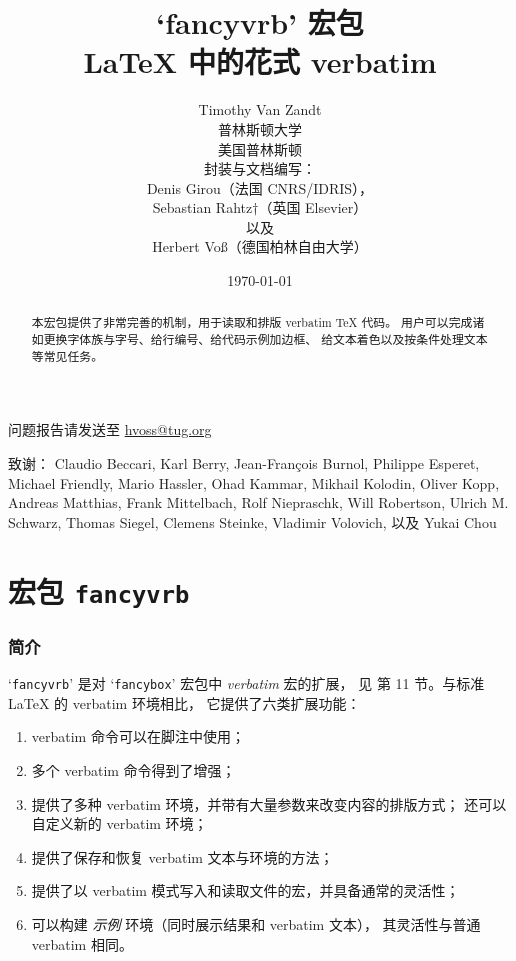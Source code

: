 \documentclass[twoside]{article}
\title{`\textsf{fancyvrb}' 宏包\\\LaTeX{} 中的花式 verbatim}
\author{Timothy Van Zandt\\普林斯顿大学\\美国普林斯顿\\[5mm]
        {封装与文档编写：}\\
        {\footnotesize Denis Girou（法国 CNRS/IDRIS），}\\[-.2mm]
        {\footnotesize Sebastian Rahtz$\dagger$（英国 Elsevier）}\\[-.2mm]
        {\footnotesize 以及}\\[-.2mm]
        {\footnotesize Herbert Voß（德国柏林自由大学）}
        }
\date{\today}
\newcommand\FBoxPackage{`\texttt{fancybox}'}
\newcommand\FVrbPackage{`\texttt{fancyvrb}'}
\begin{document}
\maketitle
%
\begin{abstract}
本宏包提供了非常完善的机制，用于读取和排版 verbatim \TeX{} 代码。
用户可以完成诸如更换字体族与字号、给行编号、给代码示例加边框、
给文本着色以及按条件处理文本等常见任务。
\end{abstract}

\begin{center}
问题报告请发送至 \url{hvoss@tug.org}
\end{center}

\vfill
致谢：
Claudio Beccari,
Karl Berry,
Jean-François Burnol,
Philippe Esperet,
Michael Friendly,
Mario Hassler,
Ohad Kammar,
Mikhail Kolodin,
Oliver Kopp,
Andreas Matthias,
Frank Mittelbach,
Rolf Niepraschk,
Will Robertson,
Ulrich M. Schwarz,
Thomas Siegel,
Clemens Steinke,
Vladimir Volovich,
以及
Yukai Chou
\clearpage
\tableofcontents
\clearpage


\part{宏包 \texttt{fancyvrb}}


\section{简介}
%
\FVrbPackage{} 是对 \FBoxPackage{} 宏包中 \emph{verbatim} 宏的扩展，
见 \cite{ctan-fancybox} 第 11 节。与标准 \LaTeX{} 的 \textsf{verbatim} 环境相比，
它提供了六类扩展功能：

\begin{enumerate}
  \item verbatim 命令可以在脚注中使用；
  \item 多个 verbatim 命令得到了增强；
  \item 提供了多种 verbatim 环境，并带有大量参数来改变内容的排版方式；
  还可以自定义新的 verbatim 环境；
  \item 提供了保存和恢复 verbatim 文本与环境的方法；
  \item 提供了以 verbatim 模式写入和读取文件的宏，并具备通常的灵活性；
  \item 可以构建 \emph{示例} 环境（同时展示结果和 verbatim 文本），
  其灵活性与普通 verbatim 相同。
\end{enumerate}
\end{document}
